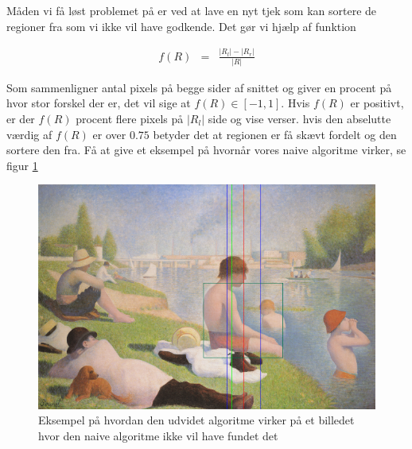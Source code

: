 {Måden vi få løst problemet på er ved at lave en nyt tjek som kan sortere
de regioner fra som vi ikke vil have godkende. Det gør vi hjælp af
funktion

\begin{eqnarray}
    f(R) & = & \frac{|R_{l}| - |R_{r}|}{|R|}
    \label{Fordeling}
\end{eqnarray}

Som sammenligner antal pixels på begge sider af snittet og giver en
procent på hvor stor forskel der er, det vil sige at $f(R) \in [-1,1]$.
Hvis $f(R)$ er positivt, er der $f(R)$ procent flere pixels på $|R_l|$
side og vise verser. hvis den abselutte værdig af $f(R)$ er over $0.75$
betyder det at regionen er få skævt fordelt og den sortere den fra. Få
at give et eksempel på hvornår vores naive algoritme virker, se figur \ref{centerOfMass}
\begin{figure}[h]
	\begin{center}
		\includegraphics[scale=0.35,angle=0]{afsnit/vores_implementation/billeder/udvidet_loesning/centerOfMass.png}
	\end{center}
	\caption[]{Eksempel på hvordan den udvidet algoritme virker på et billedet hvor den naive algoritme ikke vil have fundet det}
	\label{centerOfMass}
\end{figure}


}


